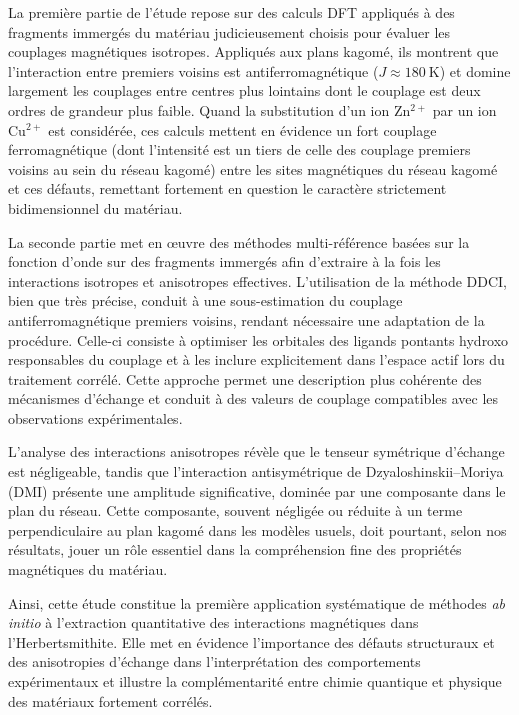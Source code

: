 \documentclass[12pt,a4paper]{report}
\numberwithin{equation}{section}
\begin{document}
La première partie de l’étude repose sur des calculs DFT appliqués à des fragments immergés du matériau judicieusement choisis pour évaluer les couplages magnétiques isotropes. 
Appliqués aux plans kagomé, ils montrent que l'interaction entre premiers voisins est antiferromagnétique (\(J \approx 180~\mathrm{K}\)) et domine largement les couplages entre centres plus lointains dont le couplage est deux ordres de grandeur plus faible. 
Quand la substitution d'un ion Zn$^{2+}$ par un ion Cu$^{2+}$ est considérée, ces calculs mettent en évidence un fort couplage ferromagnétique (dont l'intensité est un tiers de celle des couplage premiers voisins au sein du réseau kagomé) entre les sites magnétiques du réseau kagomé et ces défauts, remettant fortement en question le caractère strictement bidimensionnel du matériau.

La seconde partie met en \oe uvre des méthodes multi-référence basées sur la fonction d’onde sur des fragments immergés afin d’extraire à la fois les interactions isotropes et anisotropes effectives. 
L’utilisation de la méthode DDCI, bien que très précise, conduit à une sous-estimation du couplage antiferromagnétique premiers voisins, rendant nécessaire une adaptation de la procédure. 
Celle-ci consiste à optimiser les orbitales des ligands pontants hydroxo responsables du couplage et à les inclure explicitement dans l’espace actif lors du traitement corrélé. 
Cette approche permet une description plus cohérente des mécanismes d’échange et conduit à des valeurs de couplage compatibles avec les observations expérimentales.  

L’analyse des interactions anisotropes révèle que le tenseur symétrique d’échange est négligeable, tandis que l’interaction antisymétrique de Dzyaloshinskii–Moriya (DMI) présente une amplitude significative, dominée par une composante dans le plan du réseau. 
Cette composante, souvent négligée ou réduite à un terme perpendiculaire au plan kagomé dans les modèles usuels, doit pourtant, selon nos résultats, jouer un rôle essentiel dans la compréhension fine des propriétés magnétiques du matériau.  

Ainsi, cette étude constitue la première application systématique de méthodes \textit{ab initio} à l’extraction quantitative des interactions magnétiques dans l’Herbertsmithite. 
Elle met en évidence l’importance des défauts structuraux et des anisotropies d’échange dans l’interprétation des comportements expérimentaux et illustre la complémentarité entre chimie quantique et physique des matériaux fortement corrélés.
\end{document}
